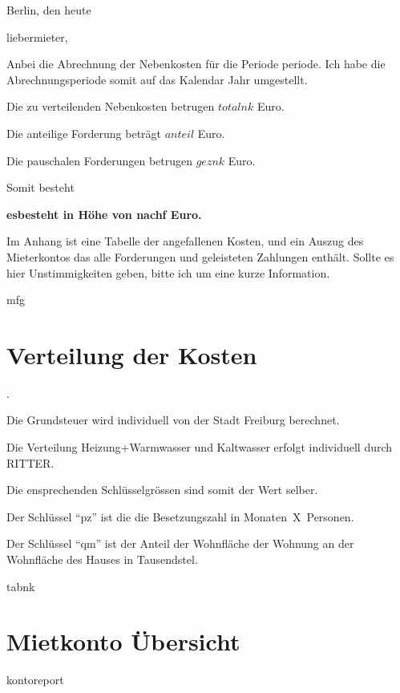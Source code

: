 \documentclass[12pt]{article}
\newcommand{\euro}{Euro}
\begin{document}
\hfill Berlin, den {{heute}}

{{liebermieter}},

\bigskip

Anbei die Abrechnung der Nebenkosten für die Periode {{periode}}.
Ich habe die Abrechnungsperiode somit auf das Kalendar Jahr umgestellt.

Die zu verteilenden Nebenkosten betrugen ${{totalnk}}$ \euro.

Die anteilige Forderung beträgt ${{anteil}}$ \euro.

Die pauschalen Forderungen betrugen ${{geznk}}$ \euro. 

Somit besteht

\bigskip

\begin{centering}
{ \bf {{esbesteht}} in Höhe von {{nachf}} \euro.}
\end{centering}

\bigskip

Im Anhang ist eine Tabelle der angefallenen Kosten, und ein Auszug des 
Mieterkontos
das alle Forderungen und geleisteten Zahlungen enthält.
Sollte es hier Unstimmigkeiten geben, 
bitte ich um eine kurze Information.

\bigskip
\bigskip
\bigskip

{{mfg}}

\vfill
\eject

\section*{Verteilung der Kosten}. 

Die Grundsteuer wird individuell von der Stadt Freiburg berechnet.

Die Verteilung Heizung+Warmwasser und Kaltwasser erfolgt individuell durch RITTER. 

Die ensprechenden 
Schlüsselgrössen sind somit der Wert selber.

Der Schlüssel ``pz'' ist die die Besetzungszahl in Monaten\  X\  Personen.

Der Schlüssel ``qm'' ist der Anteil der Wohnfläche der Wohnung an 
der Wohnfläche des Hauses in Tausendstel.



\bigskip
\bigskip
\bigskip
\bigskip


  {\small
\begin{centering}
{{ tabnk }}
\end{centering}
}

\vfill\eject

\section*{Mietkonto Übersicht}
{\small
\begin{centering}
{{ kontoreport }}
\end{centering}
}
\end{document}
